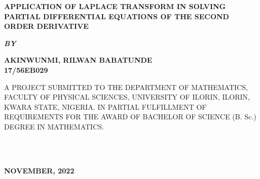 \documentclass[11pt]{report}
\newcommand{\bt}[1]{\textbf{#1}}
\begin{document}
	\clearpage
	\thispagestyle{empty}
	\begin{center}
		\Large \bt{APPLICATION OF LAPLACE TRANSFORM IN SOLVING PARTIAL DIFFERENTIAL EQUATIONS OF THE SECOND ORDER DERIVATIVE}
	\end{center}
	
	\hspace{7cm}
	
	\begin{center}
		\textbf{\textit{BY}}
	\end{center}
	
	\hspace{5cm}
	
	\begin{center}
		\large \textbf{AKINWUNMI, RILWAN BABATUNDE 
			\\
			17/56EB029}
	\end{center}
	
	\hspace{9cm}
	
	\begin{center}
		A PROJECT SUBMITTED TO THE DEPARTMENT OF MATHEMATICS, FACULTY OF PHYSICAL SCIENCES, UNIVERSITY OF ILORIN, ILORIN, KWARA STATE, NIGERIA. IN PARTIAL FULFILLMENT OF REQUIREMENTS FOR THE AWARD OF BACHELOR OF SCIENCE (B. Sc.) DEGREE IN MATHEMATICS.
	\end{center}
	
	\hspace{7cm}
%	
	\\ \\ 
	\begin{center}
		\textbf{NOVEMBER, 2022}
	\end{center}
	
	\newpage
\end{document}
